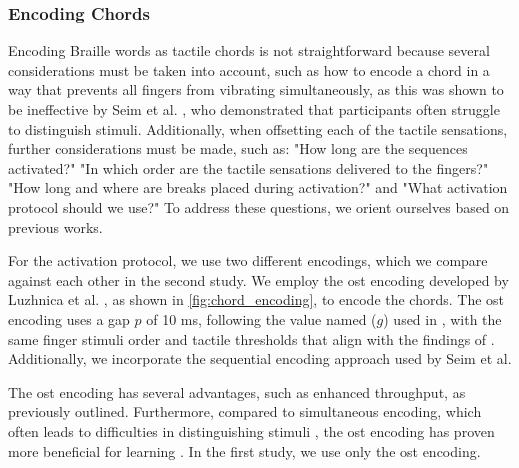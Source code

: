 



\subsubsection{Encoding Chords}
Encoding Braille words as tactile chords is not straightforward because several considerations must be taken into account, such as how to encode a chord in a way that prevents all fingers from vibrating simultaneously, as this was shown to be ineffective by Seim et al. \cite{Seim2014}, who demonstrated that participants often struggle to distinguish stimuli. Additionally, when offsetting each of the tactile sensations, further considerations must be made, such as: "How long are the sequences activated?" "In which order are the tactile sensations delivered to the fingers?" "How long and where are breaks placed during activation?" and "What activation protocol should we use?" To address these questions, we orient ourselves based on previous works.

For the activation protocol, we use two different encodings, which we compare against each other in the second study. We employ the \gls{ost} encoding developed by Luzhnica et al. \cite{Luzhnica2018, Luzhnica2018a, Luzhnica2017, Luzhnica2016}, as shown in \autoref{fig:chord_encoding}, to encode the chords. The \gls{ost} encoding uses a gap $p$ of 10 ms, following the value named ($g$) used in \cite{Luzhnica2018}, with the same finger stimuli order and tactile thresholds that align with the findings of \cite{Duncan2007}. Additionally, we incorporate the sequential encoding approach used by Seim et al.

The \gls{ost} encoding has several advantages, such as enhanced throughput, as previously outlined. Furthermore, compared to simultaneous encoding, which often leads to difficulties in distinguishing stimuli \cite{Seim2014}, the \gls{ost} encoding has proven more beneficial for learning \cite{Luzhnica2018}. In the first study, we use only the \gls{ost} encoding.


